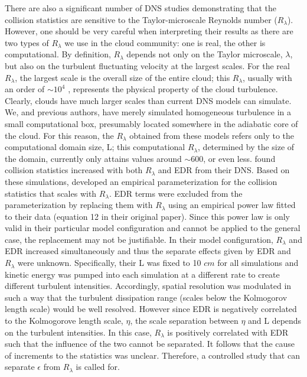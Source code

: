 There are also a significant number of DNS studies demonstrating that the collision statistics are sensitive to the Taylor-microscale Reynolds number ($R_\lambda$). However, one should be very careful when interpreting their results as there are two types of $R_\lambda$ we use in the cloud community: one is real, the other is computational. By definition, $R_\lambda$ depends not only on the Taylor microscale, $\lambda$, but also on the turbulent fluctuating velocity at the largest scales. For the real $R_\lambda$, the largest scale is the overall size of the entire cloud; this $R_\lambda$, usually with an order of $\sim 10^4$ \citep{Pinsky2006collision}, represents the physical property of the cloud turbulence. Clearly, clouds have much larger scales than current DNS models can simulate. We, and previous authors, have merely simulated homogeneous turbulence in a small computational box, presumably located somewhere in the adiabatic core of the cloud. For this reason, the $R_\lambda$ obtained from these models refers only to the computational domain size, L; this computational $R_\lambda$, determined by the size of the domain, currently only attains values around $\sim 600$, or even less. \citet{Franklin2005} found collision statistics increased with both $R_\lambda$ and EDR from their DNS. Based on these simulations, \citet{Franklin2007} developed an empirical parameterization for the collision statistics that scales with $R_\lambda$. EDR terms were excluded from the parameterization by replacing them with $R_\lambda$ using an empirical power law fitted to their data (equation 12 in their original paper). Since this power law is only valid in their particular model configuration and cannot be applied to the general case, the replacement may not be justifiable. In their model configuration, $R_\lambda$ and EDR increased simultaneously and thus the separate effects given by EDR and $R_\lambda$ were unknown. Specifically, their L was fixed to 10 $cm$ for all simulations and kinetic energy was pumped into each simulation at a different rate to create different turbulent intensities. Accordingly, spatial resolution was modulated in such a way that the turbulent dissipation range (scales below the Kolmogorov length scale) would be well resolved.  However since EDR is negatively correlated to the Kolmogorove length scale, $\eta$, the scale separation between $\eta$ and L depends on the turbulent intensities. In this case, $R_\lambda$ is positively correlated with EDR such that the influence of the two cannot be separated. It follows that the cause of increments to the statistics was unclear. Therefore, a controlled study that can separate $\epsilon$ from $R_\lambda$ is called for.

